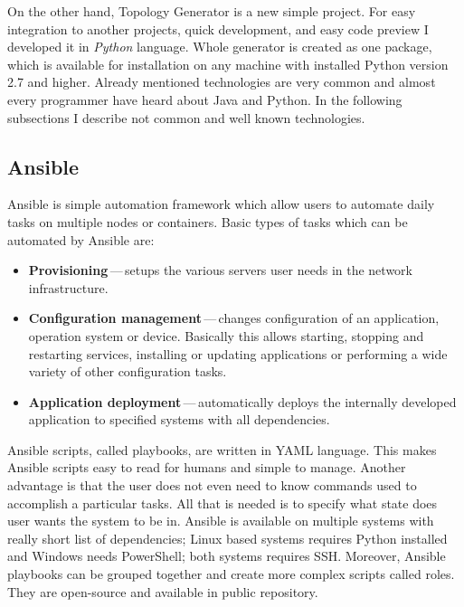 On the other hand, Topology Generator is a new simple project. For easy integration to another projects, quick development, and easy code preview I developed it in \emph{Python} language. Whole generator is created as one package, which is available for installation on any machine with installed Python version 2.7 and higher. Already mentioned technologies are very common and almost every programmer have heard about Java and Python. In the following subsections I describe not common and well known technologies.

\subsection{Ansible}
Ansible \cite{Ansible} is simple automation framework which allow users to automate daily tasks on multiple nodes or containers. Basic types of tasks which can be automated by Ansible are:

\begin{itemize}
	\item \textbf{Provisioning}\,---\,setups the various servers user needs in the network infrastructure.
	\item \textbf{Configuration management}\,---\,changes configuration of an application, operation system or device. Basically this allows starting, stopping and restarting services, installing or updating applications or performing a wide variety of other configuration tasks.
	\item \textbf{Application deployment}\,---\,automatically deploys the internally developed application to specified systems with all dependencies.
\end{itemize}

Ansible scripts, called playbooks, are written in YAML language. This makes Ansible scripts easy to read for humans and simple to manage. Another advantage is that the user does not even need to know commands used to accomplish a particular tasks. All that is needed is to specify what state does user wants the system to be in. Ansible is available on multiple systems with really short list of dependencies; Linux based systems requires Python installed and Windows needs PowerShell; both systems requires SSH. Moreover, Ansible playbooks can be grouped together and create more complex scripts called roles. They are open-source and available in public repository.

